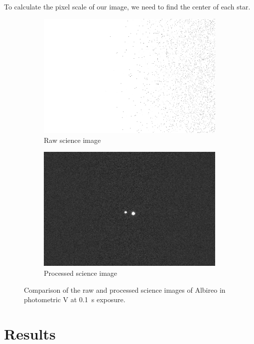 \documentclass[%
aip,
jmp,
reprint,
]{revtex4-1}
\begin{document}
	To calculate the pixel scale of our image, we need to find the center of each star. 
	
	\begin{figure}[]
		\begin{subfigure}{\linewidth}
			\centering
			\includegraphics[width=.8\linewidth]{pre.png}
			\caption{Raw science image}
		\end{subfigure}
		\begin{subfigure}{\linewidth}
			\centering
			\includegraphics[width=.8\linewidth]{post.png}
			\caption{Processed science image}
		\end{subfigure}
		\caption{Comparison of the raw and processed science images of Albireo in photometric V at \SI{0.1}{\second} exposure.}
		\label{fig:comparison}
	\end{figure}
	
	


	
	\section{Results}
	 
\end{document}
